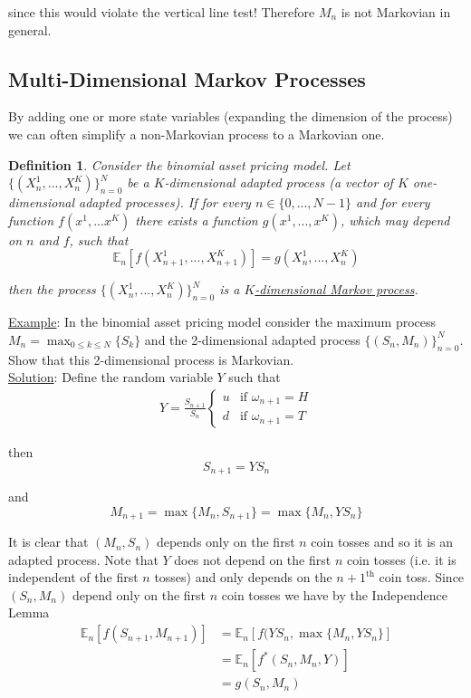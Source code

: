 \documentclass[12pt]{article}
\newtheorem{definition}{Definition}
\newlength\tindent
\renewcommand{\indent}{\hspace*{\tindent}}
\newcommand{\E}{\mathbb E}
\begin{document}
since this would violate the vertical line test! Therefore $M_n$ is not Markovian in general.

\subsection{Multi-Dimensional Markov Processes}

\indent By adding one or more state variables (expanding the dimension of the process) we can often simplify a non-Markovian process to a Markovian one.

\begin{definition} Consider the binomial asset pricing model. Let $\{(X^1_n,...,X^K_n)\}^N_{n = 0}$ be a $K$-dimensional adapted process (a vector of $K$ one-dimensional adapted processes). If for every $n \in \{0,..., N - 1\}$ and for every function $f(x^1,...x^K)$ there exists a function $g(x^1,...,x^K)$, which may depend on $n$ and $f$, such that
\begin{equation*}
	\E_n \left[ f(X^1_{n + 1},...,X^K_{n + 1}) \right] = g(X^1_n,...,X^K_n)
\end{equation*}

then the process $\{(X^1_n,...,X^K_n)\}^N_{n = 0}$ is a \underline{$K$-dimensional Markov process}.
\end{definition}

\underline{Example}: In the binomial asset pricing model consider the maximum process $M_n = \max_{0 \leq k \leq N} \{S_k\}$ and the 2-dimensional adapted process $\{(S_n,M_n )\}^N_{n = 0}$. Show that this 2-dimensional process is Markovian. \\

\underline{Solution}: Define the random variable $Y$ such that
\begin{align*}
	Y = \frac{S_{n + 1}}{S_n}
	\begin{cases}
		u & \text{if } \omega_{n + 1} = H \\
		d & \text{if } \omega_{n + 1} = T
	\end{cases}
\end{align*}

then 
\begin{equation*}
	S_{n + 1} = YS_n
\end{equation*}

and
\begin{equation*}
	M_{n + 1} = \max \{M_n, S_{n + 1} \} = \max \{M_n, YS_n\}
\end{equation*}

\indent It is clear that $(M_n, S_n)$ depends only on the first $n$ coin tosses and so it is an adapted process. Note that $Y$ does not depend on the first $n$ coin tosses (i.e. it is independent of the first $n$ tosses) and only depends on the $n + 1^{\text{th}}$ coin toss. Since $(S_n, M_n)$ depend only on the first $n$ coin tosses we have by the Independence Lemma
\begin{align*}
	\E_n [ f(S_{n + 1}, M_{n + 1} ) ] &= \E_n [ f(YS_n, \max \{M_n, YS_n\}  ] \\
	&= \E_n [ f^*(S_n, M_n, Y) ] \\
	&= g(S_n, M_n)
\end{align*}
\end{document}
